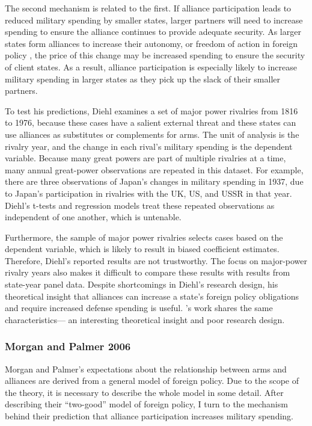 \documentclass[12pt]{article}
\begin{document}
The second mechanism is related to the first. 
If alliance participation leads to reduced military spending by smaller states, larger partners will need to increase spending to ensure the alliance continues to provide adequate security. 
As larger states form alliances to increase their autonomy, or freedom of action in foreign policy \citep{Morrow1991}, the price of this change may be increased spending to ensure the security of client states. 
As a result, alliance participation is especially likely to increase military spending in larger states as they pick up the slack of their smaller partners. 


To test his predictions, Diehl examines a set of major power rivalries from 1816 to 1976, because these cases have a salient external threat and these states can use alliances as substitutes or complements for arms.
The unit of analysis is the rivalry year, and the change in each rival's military spending is the dependent variable. 
Because many great powers are part of multiple rivalries at a time, many annual great-power observations are repeated in this dataset. 
For example, there are three observations of Japan's changes in military spending in 1937, due to Japan's participation in rivalries with the UK, US, and USSR in that year. %
Diehl's t-tests and regression models treat these repeated observations as independent of one another, which is untenable. 


Furthermore, the sample of major power rivalries selects cases based on the dependent variable, which is likely to result in biased coefficient estimates. 
Therefore, Diehl's reported results are not trustworthy. 
The focus on major-power rivalry years also makes it difficult to compare these results with results from state-year panel data. 
Despite shortcomings in Diehl's research design, his theoretical insight that alliances can increase a state's foreign policy obligations and require increased defense spending is useful.  
\citet{MorganPalmer2006}'s work shares the same characteristics--- an interesting theoretical insight and poor research design. 



\subsubsection{Morgan and Palmer 2006}


Morgan and Palmer's expectations about the relationship between arms and alliances are derived from a general model of foreign policy. 
Due to the scope of the theory, it is necessary to describe the whole model in some detail. 
After describing their ``two-good'' model of foreign policy, I turn to the mechanism behind their prediction that alliance participation increases military spending. 
\end{document}
